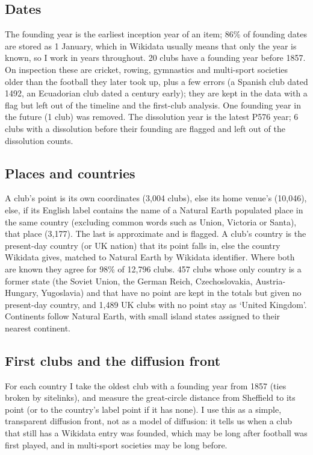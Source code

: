 \documentclass[11pt,a4paper]{article}
\begin{document}
\subsection{Dates}
The founding year is the earliest inception year of an item; 86\% of founding dates are stored as 1 January, which in Wikidata usually means that only the year is known, so I work in years throughout. 20 clubs have a founding year before 1857. On inspection these are cricket, rowing, gymnastics and multi-sport societies older than the football they later took up, plus a few errors (a Spanish club dated 1492, an Ecuadorian club dated a century early); they are kept in the data with a flag but left out of the timeline and the first-club analysis. One founding year in the future (1 club) was removed. The dissolution year is the latest P576 year; 6 clubs with a dissolution before their founding are flagged and left out of the dissolution counts.

\subsection{Places and countries}
A club's point is its own coordinates (3,004 clubs), else its home venue's (10,046), else, if its English label contains the name of a Natural Earth populated place in the same country (excluding common words such as Union, Victoria or Santa), that place (3,177). The last is approximate and is flagged. A club's country is the present-day country (or UK nation) that its point falls in, else the country Wikidata gives, matched to Natural Earth by Wikidata identifier. Where both are known they agree for 98\% of 12,796 clubs. 457 clubs whose only country is a former state (the Soviet Union, the German Reich, Czechoslovakia, Austria-Hungary, Yugoslavia) and that have no point are kept in the totals but given no present-day country, and 1,489 UK clubs with no point stay as `United Kingdom'. Continents follow Natural Earth, with small island states assigned to their nearest continent.

\subsection{First clubs and the diffusion front}
For each country I take the oldest club with a founding year from 1857 (ties broken by sitelinks), and measure the great-circle distance from Sheffield to its point (or to the country's label point if it has none). I use this as a simple, transparent diffusion front, not as a model of diffusion: it tells us when a club that still has a Wikidata entry was founded, which may be long after football was first played, and in multi-sport societies may be long before.
\end{document}
